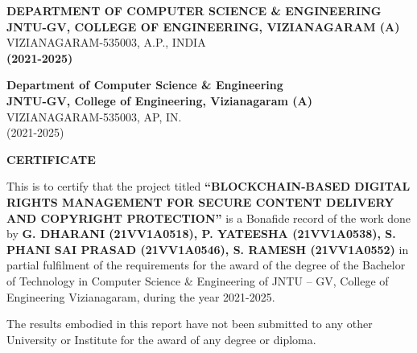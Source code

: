 \documentclass[12pt,a4paper]{report}
\begin{document}
\begin{titlepage}
\begin{center}
        \vfill
        
        
        \vspace{0.5cm}
        
        \large{\textbf{DEPARTMENT OF COMPUTER SCIENCE \& ENGINEERING}}\\
        \large{\textbf{JNTU-GV, COLLEGE OF ENGINEERING, VIZIANAGARAM (A)}}\\
        \normalsize{VIZIANAGARAM-535003, A.P., INDIA}\\
        \vspace{0.5cm}
        \large{\textbf{(2021-2025)}}
        
    \end{center}
\end{titlepage}

\setcounter{page}{2}

\newpage
\begin{center}
    \large{\textbf{Department of Computer Science \& Engineering}}\\
    \large{\textbf{JNTU-GV, College of Engineering, Vizianagaram (A)}}\\
    \normalsize{VIZIANAGARAM-535003, AP, IN.}\\
    \normalsize{(2021-2025)}
    
    \vspace{1.5cm}
    
    \Large{\textbf{CERTIFICATE}}
\end{center}

\vspace{0.5cm}
\noindent
This is to certify that the project titled \textbf{``BLOCKCHAIN-BASED DIGITAL RIGHTS MANAGEMENT FOR SECURE CONTENT DELIVERY AND COPYRIGHT PROTECTION''} is a Bonafide record of the work done by \textbf{G. DHARANI (21VV1A0518), P. YATEESHA (21VV1A0538), S. PHANI SAI PRASAD (21VV1A0546), S. RAMESH (21VV1A0552)} in partial fulfilment of the requirements for the award of the degree of the Bachelor of Technology in Computer Science \& Engineering of JNTU – GV, College of Engineering Vizianagaram, during the year 2021-2025.

\vspace{0.5cm}
\noindent
The results embodied in this report have not been submitted to any other University or Institute for the award of any degree or diploma.
\end{document}
